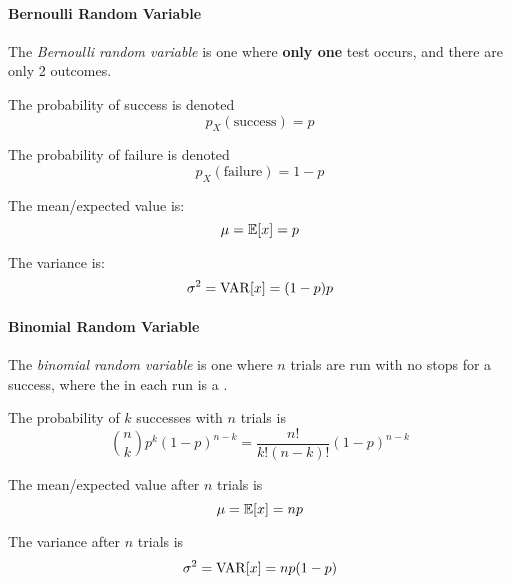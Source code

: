 \paragraph{Bernoulli Random Variable}\label{par:Bernoulli_Random_Variable}
\begin{definition}\label{def:Bernoulli_Random_Variable}
  The \emph{Bernoulli random variable} is one where \textbf{only one} test occurs, and there are only 2 outcomes.

  The probability of success is denoted
  \begin{equation}\label{eq:Bernoulli_Random_Variable-Success}
    p_{X}(\text{success}) = p
  \end{equation}

  The probability of failure is denoted
  \begin{equation}\label{eq:Bernoulli_Random_Variable-Failure}
    p_{X}(\text{failure}) = 1-p
  \end{equation}

  The mean/expected value is:
  \begin{equation}\label{eq:Bernoulli_Random_Variable-Expected_Value}
    \mu = \operatorname{\operatorname{\mathbb{E}}}[x] = p
  \end{equation}

  The variance is:
  \begin{equation}\label{eq:Bernoulli_Random_Variable-Variance}
    \sigma^{2} = \operatorname{\operatorname{VAR}}[x] = (1-p) p
  \end{equation}
\end{definition}

\paragraph{Binomial Random Variable}\label{par:Binomial_Random_Variable}
\begin{definition}\label{def:Binomial_Random_Variable}
  The \emph{binomial random variable} is one where $n$ trials are run with no stops for a success, where the  in each run is a .

  The probability of $k$ successes with $n$ trials is
  \begin{equation}\label{eq:Binomial_Random_Variable-Probability_Success}
    \binom{n}{k} p^{k} {(1-p)}^{n-k} = \frac{n!}{k! (n-k)!} {(1-p)}^{n-k}
  \end{equation}

  The mean/expected value after $n$ trials is
  \begin{equation}\label{eq:Bernoulli_Random_Variable-Expected_Value}
    \mu = \operatorname{\operatorname{\mathbb{E}}}[x] = np
  \end{equation}

  The variance after $n$ trials is
  \begin{equation}\label{eq:Bernoulli_Random_Variable-Variance}
    \sigma^{2} = \operatorname{\operatorname{VAR}}[x] = np (1-p)
  \end{equation}
\end{definition}

